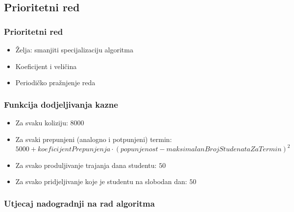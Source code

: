 \documentclass{beamer}
\begin{document}
\subsection{Prioritetni red}
\begin{frame}
\frametitle{Prioritetni red}
\begin{itemize}
  \item Želja: smanjiti specijalizaciju algoritma
  \item Koeficijent i veličina
  \item Periodičko pražnjenje reda
\end{itemize}
\end{frame}

\begin{frame}
\frametitle{Funkcija dodjeljivanja kazne}
\begin{itemize}
  \item Za svaku koliziju: $8000$
  \item Za svaki prepunjeni (analogno i potpunjeni) termin: $5000 + koeficijentPrepunjenja \cdot (popunjenost - maksimalanBrojStudenataZaTermin)^2$
  \item Za svako produljivanje trajanja dana studentu: $50$
  \item Za svako pridjeljivanje koje je studentu na slobodan dan: $50$
\end{itemize}
\end{frame}

\begin{frame}
\frametitle{Utjecaj nadogradnji na rad algoritma}
\begin{table}
  \caption{Utjecaj nadogradnji algoritma}
  \label{tbl:razvoj}
  \centering
\end{table}
\end{frame}
\end{document}
